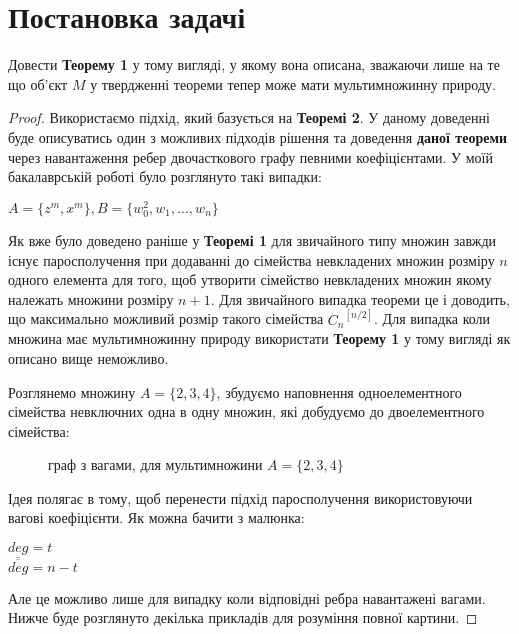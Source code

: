 \section{Постановка задачі}

\begin{theorem}
Довести {\bf Теорему 1} у тому вигляді, у якому вона описана, зважаючи лише на те що об'єкт $M$ у твердженні теореми тепер може мати мультимножинну природу.
\end{theorem}

\begin{proof}
Використаємо підхід, який базується на {\bf Теоремі 2}. У даному доведенні буде описуватись один з можливих підходів рішення та доведення {\bf даної теореми} через навантаження ребер двочасткового графу певними коефіцієнтами.
У моїй бакалаврській роботі було розглянуто такі випадки: 
\begin{center}
$A = \{z^m,x^m\}, B = \{w_0^{2}, w_1,...,w_n\}$
\end{center}

Як вже було доведено раніше у {\bf Теоремі 1} для звичайного типу множин завжди існує паросполучення при додаванні до сімейства невкладених множин розміру $n$ одного елемента для того, щоб утворити сімейство невкладених множин якому належать множини розміру $n+1$. Для звичайного випадка теореми це і доводить, що максимально можливий розмір такого сімейства ${C_n}^{[n/2]}$. Для випадка коли множина має мультимножинну природу використати {\bf Теорему 1} у тому вигляді як описано вище неможливо.

\begin{example}

Розглянемо множину $ A = \{2,3,4\} $, збудуємо наповнення одноелементного сімейства невключних одна в одну множин, які добудуємо до двоелементного сімейства:
\begin{figure}
\begin{center}
\end{center}
\caption{граф з вагами, для мультимножини $ A = \{2,3,4\}$}
\end{figure}
\end{example}

Ідея полягає в тому, щоб перенести підхід паросполучення використовуючи вагові коефіцієнти.
Як можна бачити з малюнка:
\begin{center}
$ \underline{deg} = t $
\\
$ \overline{deg} = n - t $
\end{center}
Але це можливо лише для випадку коли відповідні ребра навантажені вагами. Нижче буде розглянуто декілька прикладів для розуміння повної картини.
\end{proof}


